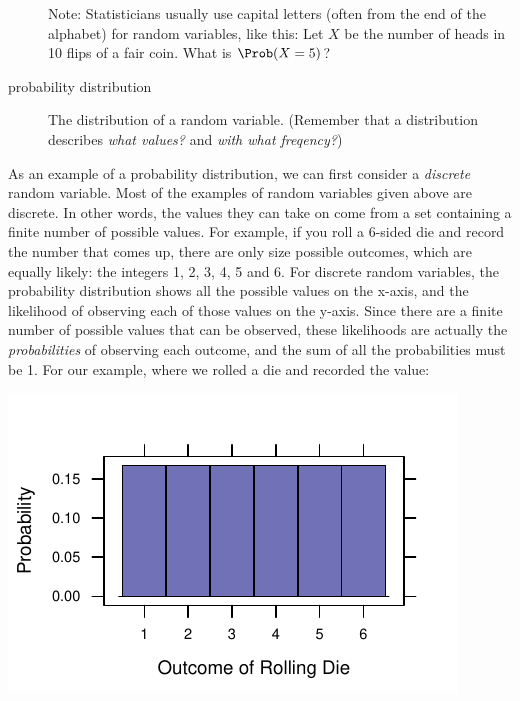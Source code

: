 \documentclass[twoside]{book}\usepackage[]{graphicx}\usepackage[]{xcolor}
\makeatletter
\def\maxwidth{ %
  \ifdim\Gin@nat@width>\linewidth
    \linewidth
  \else
    \Gin@nat@width
  \fi
}
\newenvironment{knitrout}{}{} %
\newcounter{example}[section]
\makeatother
\begin{document}
\begin{description}
Note: Statisticians usually use capital letters (often from the end of the alphabet)
for random variables, like this:  
Let $X$ be the number of heads in 10 flips of a fair coin.  What is $\Prob(X=5)$?


\item[probability distribution]
The distribution of a random variable.
(Remember that a distribution describes \emph{what values?} and 
\emph{with what freqency?})
\end{description}

As an example of a probability distribution, we can first consider a \emph{discrete} random variable.  Most of the examples of random variables given above are discrete. In other words, the values they can take on come from a set containing a finite number of possible values.  For example, if you roll a 6-sided die and record the number that comes up, there are only size possible outcomes, which are equally likely: the integers 1, 2, 3, 4, 5 and 6.  For discrete random variables, the probability distribution shows all the possible values on the x-axis, and the likelihood of observing each of those values on the y-axis.  Since there are a finite number of possible values that can be observed, these likelihoods are actually the \emph{probabilities} of observing each outcome, and the sum of all the probabilities must be 1.  For our example, where we rolled a die and recorded the value:

\begin{knitrout}
\color{fgcolor}

{\centering \includegraphics[width=\maxwidth]{figures/fig-discrete_pmf-1} 

}



\end{knitrout}
\end{document}
